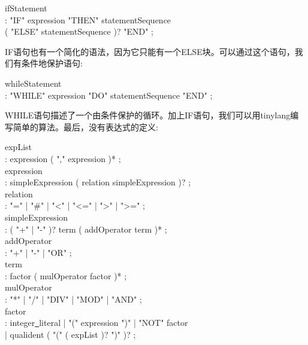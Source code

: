 \begin{tcolorbox}[colback=white,colframe=black]
ifStatement \\
\hspace*{0.5cm}: "IF" expression "THEN" statementSequence \\
\hspace*{0.5cm}( "ELSE" statementSequence )? "END" ;
\end{tcolorbox}

IF语句也有一个简化的语法，因为它只能有一个ELSE块。可以通过这个语句，我们有条件地保护语句:\par

\begin{tcolorbox}[colback=white,colframe=black]
whileStatement \\
\hspace*{0.5cm}: "WHILE" expression "DO" statementSequence "END" ;
\end{tcolorbox}

WHILE语句描述了一个由条件保护的循环。加上IF语句，我们可以用tinylang编写简单的算法。最后，没有表达式的定义:\par

\begin{tcolorbox}[colback=white,colframe=black]
expList \\
\hspace*{0.5cm}: expression ( "," expression )* ; \\
expression \\
\hspace*{0.5cm}: simpleExpression ( relation simpleExpression )? ; \\
relation \\
\hspace*{0.5cm}: "=" | "\#" | "<" | "<=" | ">" | ">=" ; \\
simpleExpression \\
\hspace*{0.5cm}: ( "+" | "-" )? term ( addOperator term )* ; \\
addOperator \\
\hspace*{0.5cm}: "+" | "-" | "OR" ; \\
term \\
\hspace*{0.5cm}: factor ( mulOperator factor )* ; \\
mulOperator \\
\hspace*{0.5cm}: "*" | "/" | "DIV" | "MOD" | "AND" ; \\
factor \\
\hspace*{0.5cm}: integer\underline{~}literal | "(" expression ")" | "NOT" factor \\
| qualident ( "(" ( expList )? ")" )? ;
\end{tcolorbox}

